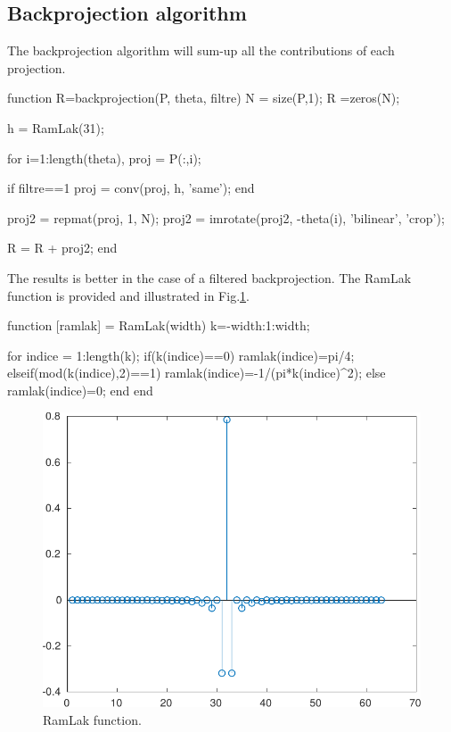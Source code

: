 \subsection{Backprojection algorithm}
The backprojection algorithm will sum-up all the contributions of each projection.

\begin{matlab}
function R=backprojection(P, theta, filtre)
N = size(P,1);
R =zeros(N);

h = RamLak(31);

for i=1:length(theta),
    proj = P(:,i);
    
    if filtre==1
        proj = conv(proj, h, 'same');
    end
    
    proj2 = repmat(proj, 1, N);
    proj2 = imrotate(proj2, -theta(i), 'bilinear', 'crop');
    
    R = R + proj2;
end 
\end{matlab}

The results is better in the case of a filtered backprojection. The RamLak function is provided and illustrated in Fig.\ref{fig:tomography:matlab:ramlak}.
\begin{matlab}
function [ramlak] = RamLak(width)
k=-width:1:width;

for indice = 1:length(k);
  if(k(indice)==0) %
     ramlak(indice)=pi/4;
  elseif(mod(k(indice),2)==1) %
     ramlak(indice)=-1/(pi*k(indice)^2);
  else %
     ramlak(indice)=0;
  end
end 
\end{matlab}

\begin{figure}[htbp]
 \centering
 
 \includegraphics[width=.45\linewidth]{ramlak.pdf}
 
 \caption{RamLak function.}
 \label{fig:tomography:matlab:ramlak}
\end{figure}

